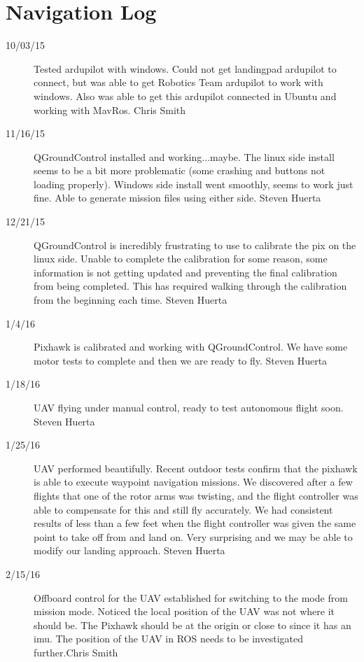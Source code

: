 \section{Navigation Log}

\begin{description}

\item [10/03/15]  Tested ardupilot with windows. Could not get landingpad ardupilot to connect, but was able to get Robotics Team ardupilot to work with windows. Also was able to get this ardupilot connected in Ubuntu and working with MavRos. \hfill{Chris Smith}

\item [11/16/15]  QGroundControl installed and working...maybe. The linux side install seems to be a bit more problematic (some crashing and buttons not loading properly). Windows side install went smoothly, seems to work just fine. Able to generate mission files using either side.  \hfill{Steven Huerta}

\item [12/21/15]  QGroundControl is incredibly frustrating to use to calibrate the pix on the linux side. Unable to complete the calibration for some reason, some information is not getting updated and preventing the final calibration from being completed. This has required walking through the calibration from the beginning each time.  \hfill{Steven Huerta}

\item [1/4/16]  Pixhawk is calibrated and working with QGroundControl. We have some motor tests to complete and then we are ready to fly. \hfill{Steven Huerta}

\item [1/18/16]  UAV flying under manual control, ready to test autonomous flight soon. \hfill{Steven Huerta}

\item [1/25/16]  UAV performed beautifully. Recent outdoor tests confirm that the pixhawk is able to execute waypoint navigation missions. We discovered after a few flights that one of the rotor arms was twisting, and the flight controller was able to compensate for this and still fly accurately. We had consistent results of less than a few feet when the flight controller was given the same point to take off from and land on. Very surprising and we may be able to modify our landing approach.  \hfill{Steven Huerta}

\item [2/15/16]  Offboard control for the UAV established for switching to the mode from mission mode. Noticed the local position of the UAV was not where it should be. The Pixhawk should be at the origin or close to since it has an imu. The position of the UAV in ROS needs to be investigated further.\hfill{Chris Smith}


\end{description}

